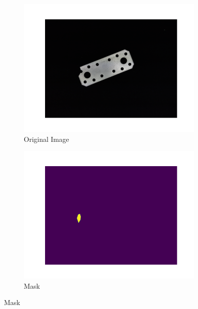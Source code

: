 \begin{figure}[htbp]
    \captionsetup[subfigure]{justification=centering}
    \centering
    \begin{subfigure}[b]{0.3\textwidth}
        \centering
        \includegraphics[width=\textwidth]{figures/pca_results/cut_corner.png}
        \caption*{Original Image}

    \end{subfigure}
    \begin{subfigure}[b]{0.3\textwidth}
        \centering
        \includegraphics[width=\textwidth]{figures/pca_results/cut_corner_mask.png}
        \caption*{Mask}


\end{subfigure}
\end{figure}
